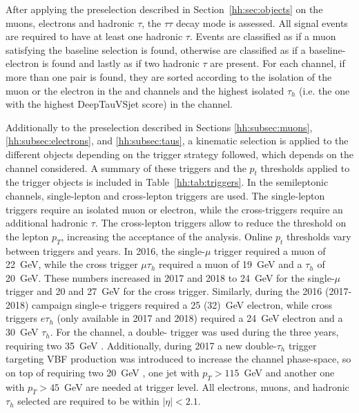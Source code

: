 \documentclass[../main.tex]{subfiles}
\begin{document}
After applying the preselection described in Section~\ref{hh:sec:objects} on the muons, electrons and hadronic $\tau$, the $\tau\tau$ decay mode is assessed. All signal events are required to have at least one hadronic $\tau$. Events are classified as \taumu\tauh{} if a muon satisfying the baseline selection is found, otherwise are classified as \taue\tauh{} if a baseline-electron is found and lastly as \tauh\tauh{} if two hadronic $\tau$ are present. For each channel, if more than one pair is found, they are sorted according to the isolation of the muon or the electron in the \taumu\tauh{} and \taue\tauh{} channels and the highest isolated $\tau_h$ (i.e. the one with the highest DeepTauVSjet score) in the \tauh\tauh{} channel.

Additionally to the preselection described in Sections \ref{hh:subsec:muons}, \ref{hh:subsec:electrons}, and \ref{hh:subsec:taus}, a kinematic selection is applied to the different objects depending on the trigger strategy followed, which depends on the channel considered. A summary of these triggers and the $p_t$ thresholds applied to the trigger objects is included in Table~\ref{hh:tab:triggers}. In the semileptonic channels, single-lepton and cross-lepton triggers are used. The single-lepton triggers require an isolated muon or electron, while the cross-triggers require an additional hadronic $\tau$. The cross-lepton triggers allow to reduce the threshold on the lepton $p_T$, increasing the acceptance of the analysis. Online $p_t$ thresholds vary between triggers and years. In 2016, the single-$\mu$ trigger required a muon of 22~GeV, while the cross trigger $\mu\tau_h$ required a muon of 19~GeV and a $\tau_h$ of 20~GeV. These numbers increased in 2017 and 2018 to 24~GeV for the single-$\mu$ trigger and 20 and 27~GeV for the cross trigger. Similarly, during the 2016 (2017-2018) campaign single-e triggers required a 25 (32)~GeV electron, while cross triggers $e\tau_h$ (only available in 2017 and 2018) required a 24~GeV electron and a 30~GeV $\tau_h$. For the \tauh\tauh{} channel, a double-\tauh{} trigger was used during the three years, requiring two 35~GeV \tauh{}. Additionally, during 2017 a new double-$\tau_h$ trigger targeting VBF production was introduced to increase the \tauh\tauh{} channel phase-space, so on top of requiring two 20~GeV \tauh{}, one jet with $p_T>115$~GeV and another one with $p_T>45$~GeV are needed at trigger level. All electrons, muons, and hadronic $\tau_h$ selected are required to be within $|\eta| < 2.1$.
\end{document}
